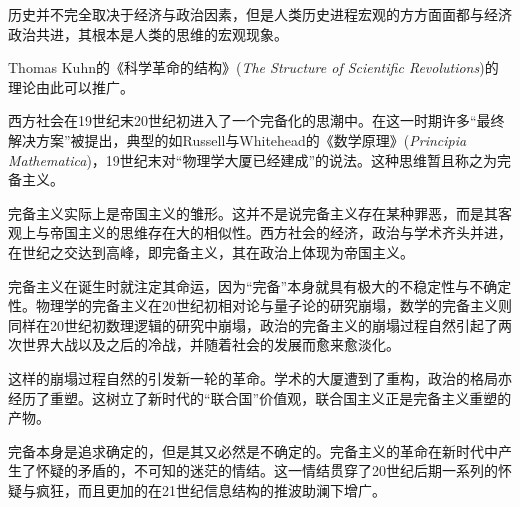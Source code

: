 \documentclass{ctexart}
\begin{document}
历史并不完全取决于经济与政治因素，但是人类历史进程宏观的方方面面都与经济政治共进，其根本是人类的思维的宏观现象。

Thomas Kuhn的《科学革命的结构》(\textit{The Structure of Scientific Revolutions})的理论由此可以推广。

西方社会在19世纪末20世纪初进入了一个完备化的思潮中。在这一时期许多“最终解决方案”被提出，典型的如Russell与Whitehead的《数学原理》(\textit{Principia Mathematica})，19世纪末对“物理学大厦已经建成”的说法。这种思维暂且称之为完备主义。

完备主义实际上是帝国主义的雏形。这并不是说完备主义存在某种罪恶，而是其客观上与帝国主义的思维存在大的相似性。西方社会的经济，政治与学术齐头并进，在世纪之交达到高峰，即完备主义，其在政治上体现为帝国主义。

完备主义在诞生时就注定其命运，因为“完备”本身就具有极大的不稳定性与不确定性。物理学的完备主义在20世纪初相对论与量子论的研究崩塌，数学的完备主义则同样在20世纪初数理逻辑的研究中崩塌，政治的完备主义的崩塌过程自然引起了两次世界大战以及之后的冷战，并随着社会的发展而愈来愈淡化。

这样的崩塌过程自然的引发新一轮的革命。学术的大厦遭到了重构，政治的格局亦经历了重塑。这树立了新时代的“联合国”价值观，联合国主义正是完备主义重塑的产物。

完备本身是追求确定的，但是其又必然是不确定的。完备主义的革命在新时代中产生了怀疑的矛盾的，不可知的迷茫的情结。这一情结贯穿了20世纪后期一系列的怀疑与疯狂，而且更加的在21世纪信息结构的推波助澜下增广。
\end{document}
